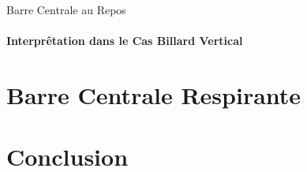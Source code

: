 \documentclass{beamer}
\begin{document}
  \begin{frame}{Barre Centrale au Repos}
  \framesubtitle{Interprêtation dans le Cas Billard Vertical}
  \end{frame}

  
  \section{Barre Centrale Respirante}
  
  \begin{frame}
  \end{frame}
  
  \section{Conclusion}
  
  \begin{frame}
  \end{frame}
  
\end{document}
